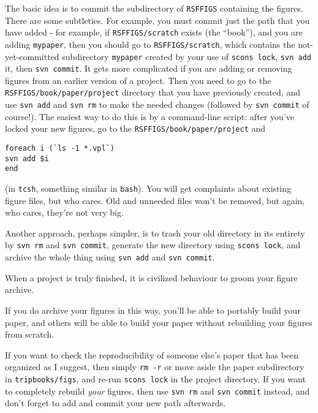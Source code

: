 The basic idea is to commit the subdirectory of {\tt RSFFIGS} containing the figures. There are some subtleties. For example, you must commit just the path that you have added - for example, if {\tt RSFFIGS/scratch} exists (the ``book''), and you are adding {\tt mypaper}, then you should go to {\tt RSFFIGS/scratch}, which contains the not-yet-committed subdirectory {\tt mypaper} created by your use of {\tt scons lock}, {\tt svn add} it, then {\tt svn commit}. It gets more complicated if you are adding or removing figures from an earlier version of a project. Then you need to go to the {\tt RSFFIGS/book/paper/project} directory that you have previously created, and use {\tt svn add} and {\tt svn rm} to make the needed changes (followed by {\tt svn commit} of course!). The easiest way to do this is by a command-line script: after you've locked your new figures, go to the {\tt RSFFIGS/book/paper/project} and 
\begin{verbatim}
foreach i (`ls -1 *.vpl`)
svn add $i
end
\end{verbatim}
(in {\tt tcsh}, something similar in {\tt bash}). You will get complaints about existing figure files, but who cares. Old and unneeded files won't be removed, but again, who cares, they're not very big.

Another approach, perhaps simpler, is to trash your old directory in its entirety by {\tt svn rm} and {\tt svn commit}, generate the new directory using {\tt scons lock}, and archive the whole thing using {\tt svn add} and {\tt svn commit}.

When a project is truly finished, it is civilized behaviour to groom your figure archive.

If you do archive your figures in this way, you'll be able to portably build your paper, and others will be able to build your paper without rebuilding your figures from scratch.

If you want to check the reproducibility of someone else's paper that has been organized as I suggest, then simply {\tt rm -r} or move aside the paper subdirectory in {\tt tripbooks/figs}, and re-run {\tt scons lock} in the project directory. If you want to completely rebuild {\em your} figures, then use {\tt svn rm} and {\tt svn commit} instead, and don't forget to add and commit your new path afterwards.

